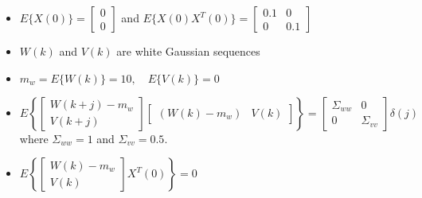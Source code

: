 \begin{itemize}
    \item
    $E \{ X(0) \} = \begin{bmatrix} 0 \\ 0 \end{bmatrix}$ and $E \{ X(0) X^T(0) \} = \begin{bmatrix} 0.1 & 0 \\ 0 & 0.1 \end{bmatrix}$

    \item
    $W(k)$ and $V(k)$ are white Gaussian sequences

    \item
    $m_{w} = E \{ W(k) \} = 10, \quad E \{ V(k) \} = 0$

    \item
    $E \left\{ \begin{bmatrix}
        W(k+j) - m_w  \\
        V(k+j)
    \end{bmatrix} \begin{bmatrix}
        (W(k) - m_w) &
        V(k)
    \end{bmatrix} \right\} = \begin{bmatrix}
        \Sigma_{ww} & 0 \\
        0 & \Sigma_{vv}
    \end{bmatrix} \delta(j)$ where \newline
    $\Sigma_{ww} = 1$ and $\Sigma_{vv} = 0.5$.
    
    \item
    $E \left\{ \begin{bmatrix}
        W(k) - m_w  \\
        V(k)
    \end{bmatrix} X^T(0) \right\} = 0$

\end{itemize}

